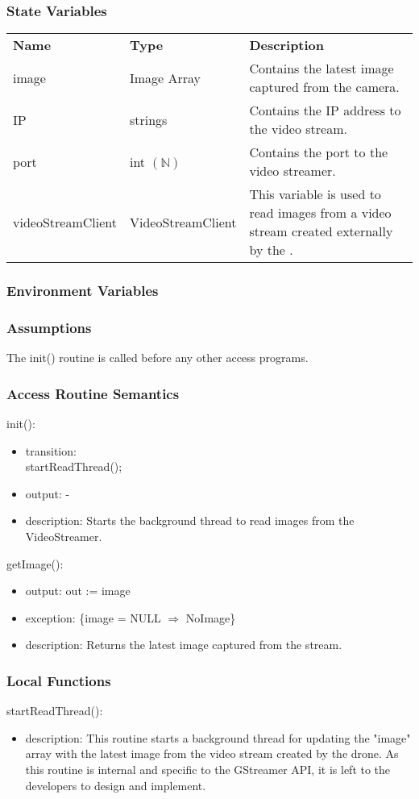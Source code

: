 \documentclass[12pt, titlepage]{article}
\begin{document}
\subsubsection{State Variables}
\begin{center}
\begin{tabular}{p{3 cm} p{3.2cm} p{6.5cm} }
\hline
\textbf{Name} & \textbf{Type} & \textbf{Description}  \\
image & Image Array & Contains the latest image captured from the camera. \\
IP &  strings & Contains the IP address to the video stream. \\
port & int $(\mathbb{N})$ & Contains the port to the video streamer. \\
videoStreamClient & VideoStreamClient & This variable is used to read images from a video stream created externally by the \nameref{Drone Camera}.   \\
\hline
\hline
\end{tabular}
\end{center}
\subsubsection{Environment Variables}
\subsubsection{Assumptions}
The init() routine is called before any other access programs.
\subsubsection{Access Routine Semantics}
\noindent init():
\begin{itemize}
\item transition:\\startReadThread();
\item output: -
\item description: Starts the background thread to read images from the VideoStreamer.
\end{itemize}
\noindent getImage():
\begin{itemize}
\item output: out := image 
\item exception: \{image = NULL $\Rightarrow$ NoImage\}
\item description: Returns the latest image captured from the stream. 
\end{itemize}
\subsubsection{Local Functions}
\noindent startReadThread():
\begin{itemize}
\item description: This routine starts a background thread for updating the "image" array with the latest image from the video stream created by the drone. As this routine is internal and specific to the GStreamer API, it is left to the developers to design and implement. 
\end{itemize}
\newpage
\end{document}
